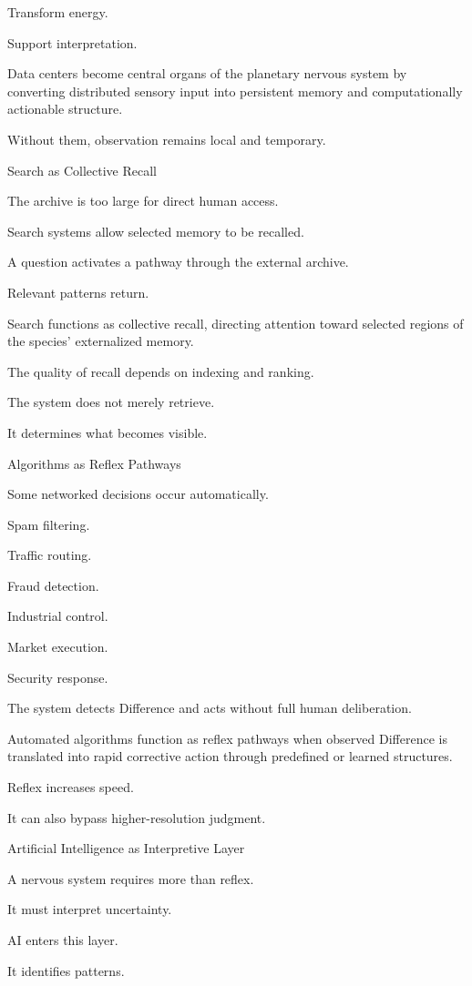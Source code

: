 Transform energy.

Support interpretation.

Data centers become central organs of the planetary nervous system by converting distributed sensory input into persistent memory and computationally actionable structure.

Without them, observation remains local and temporary.

Search as Collective Recall

The archive is too large for direct human access.

Search systems allow selected memory to be recalled.

A question activates a pathway through the external archive.

Relevant patterns return.

Search functions as collective recall, directing attention toward selected regions of the species’ externalized memory.

The quality of recall depends on indexing and ranking.

The system does not merely retrieve.

It determines what becomes visible.

Algorithms as Reflex Pathways

Some networked decisions occur automatically.

Spam filtering.

Traffic routing.

Fraud detection.

Industrial control.

Market execution.

Security response.

The system detects Difference and acts without full human deliberation.

Automated algorithms function as reflex pathways when observed Difference is translated into rapid corrective action through predefined or learned structures.

Reflex increases speed.

It can also bypass higher-resolution judgment.

Artificial Intelligence as Interpretive Layer

A nervous system requires more than reflex.

It must interpret uncertainty.

AI enters this layer.

It identifies patterns.

